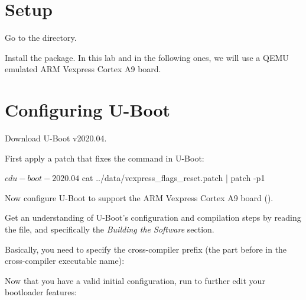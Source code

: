 
\section{Setup}

Go to the  directory.

Install the  package. In this lab and in the
following ones, we will use a QEMU emulated ARM Vexpress Cortex A9 board.

\section{Configuring U-Boot}

Download U-Boot v2020.04.

First apply a patch that fixes the  command in U-Boot:
\begin{bashinput}
$ cd u-boot-2020.04
$ cat ../data/vexpress_flags_reset.patch | patch -p1
\end{bashinput}

Now configure U-Boot to support the ARM Vexpress Cortex A9 board
().

Get an understanding of U-Boot's configuration and compilation steps
by reading the  file, and specifically the {\em Building
the Software} section.

Basically, you need to specify the cross-compiler prefix
(the part before  in the cross-compiler executable name):

Now that you have a valid initial configuration, run 
to further edit your bootloader features:

